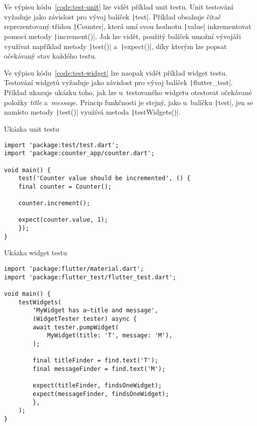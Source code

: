 Ve výpisu kódu~\ref{code:test-unit} lze vidět příklad unit testu.
Unit testování vyžaduje jako závislost pro vývoj balíček
\texttt|test|.
Příklad obsahuje čítač reprezentovaný třídou \texttt|Counter|,
která umí svou hodnotu \texttt|value| inkrementovat pomocí
metody \texttt|increment()|.
Jak lze vidět,
použitý balíček umožní vývojáři využívat například metody
\texttt|test()| a~\texttt|expect()|,
díky kterým lze popsat očekávaný stav každého testu.~\cite{testing_flutter_unit}

\pagebreak
Ve výpisu kódu~\ref{code:test-widget} lze naopak vidět příklad widget testu.
Testování widgetů vyžaduje jako závislost pro vývoj balíček
\texttt|flutter_test|.
Příklad ukazuje ukázku toho,
jak lze u~testovaného widgetu otestovat očekávané položky \emph{title}
a~\emph{message}.
Princip funkčnosti je stejný,
jako u~balíčku \texttt|test|,
jen se namísto metody \texttt|test()|
využívá metoda \texttt|testWidgets()|.~\cite{testing_flutter_widget}

\begin{listing}
    \caption{Ukázka unit testu~\cite{testing_flutter_unit}}
    \label{code:test-unit}
    \begin{verbatim}
import 'package:test/test.dart';
import 'package:counter_app/counter.dart';

void main() {
    test('Counter value should be incremented', () {
    final counter = Counter();

    counter.increment();

    expect(counter.value, 1);
    });
}
    \end{verbatim}
\end{listing}

\begin{listing}
    \caption{Ukázka widget testu~\cite{testing_flutter_widget}}
    \label{code:test-widget}
    \begin{verbatim}
import 'package:flutter/material.dart';
import 'package:flutter_test/flutter_test.dart';

void main() {
    testWidgets(
        'MyWidget has a~title and message',
        (WidgetTester tester) async {
        await tester.pumpWidget(
            MyWidget(title: 'T', message: 'M'),
        );

        final titleFinder = find.text('T');
        final messageFinder = find.text('M');

        expect(titleFinder, findsOneWidget);
        expect(messageFinder, findsOneWidget);
        },
    );
}
    \end{verbatim}
\end{listing}

